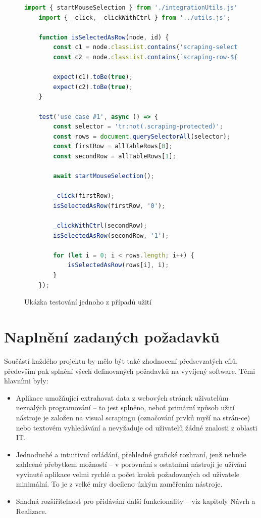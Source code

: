 \documentclass[thesis=B,czech]{FITthesis}[2012/06/26]
\begin{document}
\begin{figure}
	\begin{lstlisting}[language=JavaScript]
	import { startMouseSelection } from './integrationUtils.js';
	import { _click, _clickWithCtrl } from '../utils.js';
	
	function isSelectedAsRow(node, id) {
		const c1 = node.classList.contains('scraping-selected-row');
		const c2 = node.classList.contains(`scraping-row-${id}`);
		
		expect(c1).toBe(true);
		expect(c2).toBe(true);
	}
	
	test('use case #1', async () => {
		const selector = 'tr:not(.scraping-protected)';
		const rows = document.querySelectorAll(selector);
		const firstRow = allTableRows[0];
		const secondRow = allTableRows[1];
		
		await startMouseSelection();
		
		_click(firstRow);
		isSelectedAsRow(firstRow, '0');
		
		_clickWithCtrl(secondRow);
		isSelectedAsRow(secondRow, '1');
	
		for (let i = 0; i < rows.length; i++) {
			isSelectedAsRow(rows[i], i);
		}
	});
	\end{lstlisting}
	\caption{Ukázka testování jednoho z případů užití}
	\label{code:integration_test}
\end{figure}


\section{Naplnění zadaných požadavků}
Součástí každého projektu by mělo být také zhodnocení předsevzatých cílů, především pak splnění všech definovaných požadavků na vyvíjený software. Těmi hlavními byly:

\begin{itemize}
	\item Aplikace umožňující extrahovat data z webových stránek uživatelům neznalých programování -- to jest splněno, neboť primární způsob užití nástroje je založen na visual scrapingu (označování prvků myší na strán-ce) nebo textovém vyhledávání a nevyžaduje od uživatelů žádné znalosti z oblasti IT.
	\item Jednoduché a intuitivní ovládání, přehledné grafické rozhraní, jenž nebude zahlcené přebytkem možností -- v porovnání s ostatními nástroji je užívání vyvinuté aplikace velmi rychlé a počet kroků požadovaných od uživatele minimální. To je z velké míry docíleno úzkým zaměřením nástroje. 
	\item Snadná rozšiřitelnost pro přidávání další funkcionality -- viz kapitoly Návrh a Realizace.
\end{itemize}
\end{document}
